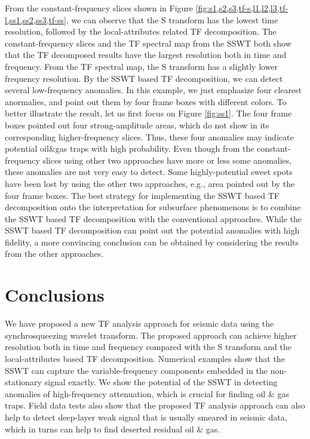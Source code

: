 From the constant-frequency slices shown in Figure \ref{fig:s1,s2,s3,tf-s,l1,l2,l3,tf-l,ss1,ss2,ss3,tf-ss}, we can observe that the S transform has the lowest time resolution, followed by the local-attributes related TF decomposition. The constant-frequency slices and the TF spectral map from the SSWT both show that the TF decomposed results have the largest resolution both in time and frequency. From the TF spectral map, the S transform has a slightly lower frequency resolution. By the SSWT based TF decomposition, we can detect several low-frequency anomalies. In this example, we just emphasize four clearest anormalies, and point out them by four frame boxes with different colors. To better illustrate the result, let us first focus on Figure \ref{fig:ss1}. The four frame boxes pointed out four strong-amplitude areas, which do not show in its corresponding higher-frequency slices. Thus, these four anomalies may indicate potential oil\&gas traps with high probability. Even though from the constant-frequency slices using other two approaches have more or less some anomalies, these anomalies are not very easy to detect. Some highly-potential sweet spots have been lost by using the other two approaches, e.g., area pointed out by the four frame boxes. The best strategy for implementing the SSWT based TF decomposition onto the interpretation for subsurface phenomenons is to combine the SSWT based TF decomposition with the conventional approaches. While the SSWT based TF decomposition can point out the potential anomalies with high fidelity, a more convincing conclusion can be obtained by considering the results from the other approaches.

\section{Conclusions}
We have proposed a new TF analysis approach for seismic data using the synchrosqueezing wavelet transform. The proposed approach can achieve higher resolution both in time and frequency compared with the S transform and the local-attributes based TF decomposition. Numerical examples show that the SSWT can capture the variable-frequency components embedded in the non-stationary signal exactly. We show the potential of the SSWT %
in detecting anomalies of high-frequency attenuation, which is crucial for finding  oil \& gas traps. Field data  tests also show that the proposed TF analysis approach can also help to detect deep-layer weak signal that is usually smeared in seismic data, which in turns can help to find deserted residual oil \& gas.



